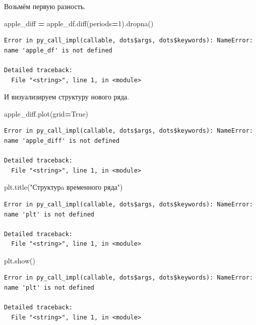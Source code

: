 \documentclass[]{book}
\newenvironment{Shaded}{\begin{snugshade}}{\end{snugshade}}
\newcommand{\DecValTok}[1]{\textcolor[rgb]{0.00,0.00,0.81}{#1}}
\newcommand{\NormalTok}[1]{#1}
\newcommand{\OperatorTok}[1]{\textcolor[rgb]{0.81,0.36,0.00}{\textbf{#1}}}
\newcommand{\StringTok}[1]{\textcolor[rgb]{0.31,0.60,0.02}{#1}}
\newcommand{\VariableTok}[1]{\textcolor[rgb]{0.00,0.00,0.00}{#1}}
\begin{document}
Возьмём первую разность.

\begin{Shaded}
\begin{Highlighting}[]
\NormalTok{apple_diff }\OperatorTok{=}\NormalTok{ apple_df.diff(periods}\OperatorTok{=}\DecValTok{1}\NormalTok{).dropna()}
\end{Highlighting}
\end{Shaded}

\begin{verbatim}
Error in py_call_impl(callable, dots$args, dots$keywords): NameError: name 'apple_df' is not defined

Detailed traceback: 
  File "<string>", line 1, in <module>
\end{verbatim}

И визуализируем структуру нового ряда.

\begin{Shaded}
\begin{Highlighting}[]
\NormalTok{apple_diff.plot(grid}\OperatorTok{=}\VariableTok{True}\NormalTok{)}
\end{Highlighting}
\end{Shaded}

\begin{verbatim}
Error in py_call_impl(callable, dots$args, dots$keywords): NameError: name 'apple_diff' is not defined

Detailed traceback: 
  File "<string>", line 1, in <module>
\end{verbatim}

\begin{Shaded}
\begin{Highlighting}[]
\NormalTok{plt.title(}\StringTok{"Структурa временного ряда"}\NormalTok{)}
\end{Highlighting}
\end{Shaded}

\begin{verbatim}
Error in py_call_impl(callable, dots$args, dots$keywords): NameError: name 'plt' is not defined

Detailed traceback: 
  File "<string>", line 1, in <module>
\end{verbatim}

\begin{Shaded}
\begin{Highlighting}[]
\NormalTok{plt.show()}
\end{Highlighting}
\end{Shaded}

\begin{verbatim}
Error in py_call_impl(callable, dots$args, dots$keywords): NameError: name 'plt' is not defined

Detailed traceback: 
  File "<string>", line 1, in <module>
\end{verbatim}
\end{document}
